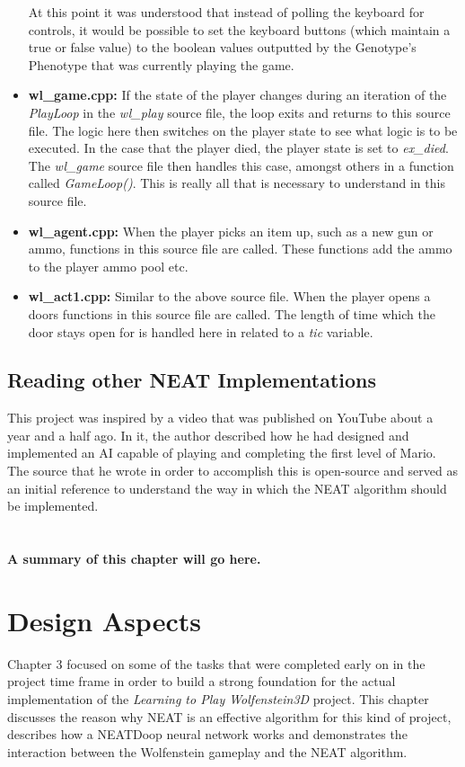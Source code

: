\documentclass[]{Learning-to-Play-Wolfenstein-thesis}
\begin{document}
\begin{itemize}
At this point it was understood that instead of polling the keyboard for controls, it would be possible to set the keyboard buttons (which maintain a true or false value) to the boolean values outputted by the Genotype's Phenotype that was currently playing the game.
\item\textbf{wl\_game.cpp:} If the state of the player changes during an iteration of the \textit{PlayLoop} in the \textit{wl\_play} source file, the loop exits and returns to this source file. The logic here then switches on the player state to see what logic is to be executed. In the case that the player died, the player state is set to \textit{ex\_died}. The \textit{wl\_game} source file then handles this case, amongst others in a function called \textit{GameLoop()}. This is really all that is necessary to understand in this source file. 
\item\textbf{wl\_agent.cpp:} When the player picks an item up, such as a new gun or ammo, functions in this source file are called. These functions add the ammo to the player ammo pool etc. 
\item\textbf{wl\_act1.cpp:} Similar to the above source file. When the player opens a doors functions in this source file are called. The length of time which the door stays open for is handled here in related to a \textit{tic} variable. 
\end{itemize}
\section{Reading other NEAT Implementations}
This project was inspired by a video that was published on YouTube about a year and a half ago. In it, the author described how he had designed and implemented an AI capable of playing and completing the first level of Mario. The source that he wrote in order to accomplish this is open-source and served as an initial reference to understand the way in which the NEAT algorithm should be implemented. \\\\\\\textbf{A summary of this chapter will go here.}


\chapter{Design Aspects}%
Chapter 3 focused on some of the tasks that were completed early on in the project time frame in order to build a strong foundation for the actual implementation of the \textit{Learning to Play Wolfenstein3D} project. This chapter discusses the reason why NEAT is an effective algorithm for this kind of project, describes how a NEATDoop neural network works and demonstrates the interaction between the Wolfenstein gameplay and the NEAT algorithm.
\end{document}
